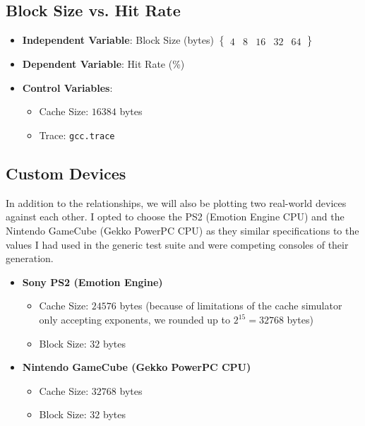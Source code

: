\documentclass[12pt, letterpaper]{article}
\begin{document}
\subsection*{Block Size vs. Hit Rate}

\begin{itemize}
    \item \textbf{Independent Variable}: Block Size (bytes) $ \begin{Bmatrix}
            4 & 8 & 16 & 32 & 64
    \end{Bmatrix} $
    \item \textbf{Dependent Variable}: Hit Rate (\%)
    \item \textbf{Control Variables}:
        \begin{itemize}
            \item Cache Size: $ 16384 $ bytes
            \item Trace: \texttt{gcc.trace}
        \end{itemize}
\end{itemize}

\subsection*{Custom Devices}

In addition to the relationships, we will also be plotting two real-world devices against each other. I opted to choose the PS2 (Emotion Engine CPU) and the Nintendo GameCube (Gekko PowerPC CPU) as they similar specifications to the values I had used in the generic test suite and were competing consoles of their generation.

\begin{itemize}
    \item \textbf{Sony PS2 (Emotion Engine)}
        \begin{itemize}
            \item Cache Size: $ 24576 $ bytes (because of limitations of the cache simulator only accepting exponents, we rounded up to $ 2^{15} = 32768 $ bytes)
            \item Block Size: $ 32 $ bytes
        \end{itemize}
    \item \textbf{Nintendo GameCube (Gekko PowerPC CPU)}
        \begin{itemize}
            \item Cache Size: $ 32768 $ bytes
            \item Block Size: $ 32 $ bytes
        \end{itemize}
    \end{itemize}
\end{document}
